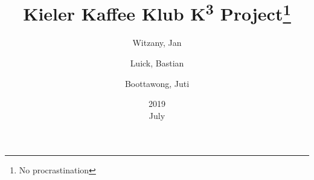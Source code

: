 \documentclass{article}
\title{Kieler Kaffee Klub K\textsuperscript{3} Project\thanks{No procrastination}}
\date{2019\\ July}
\author{
  Witzany, Jan\\
  \and
  Luick, Bastian\\
  \and
  Boottawong, Juti\\
}
\begin{document}
\begin{titlepage}
\maketitle

\end{titlepage}
\tableofcontents						%

\vspace{2cm} %
 






















  
\end{document}
